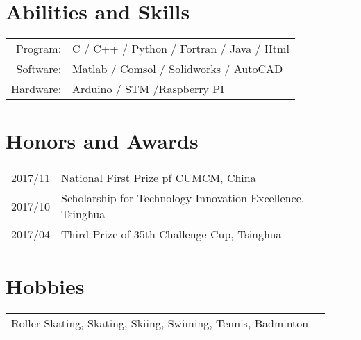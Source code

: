 \documentclass[a4paper,10pt]{article}
\begin{document}
\section{Abilities and Skills}
\begin{tabular}{rl}
Program:  & C / C++ / Python / Fortran / Java / Html \\
Software: & Matlab / Comsol / Solidworks / AutoCAD   \\
Hardware: & Arduino / STM /Raspberry PI              \\
\end{tabular}

\section{Honors and Awards}
\begin{tabular}{rl}
\textsc{2017/11} & National First Prize pf CUMCM, China                       \\
\textsc{2017/10} & Scholarship for Technology Innovation Excellence, Tsinghua \\
\textsc{2017/04} & Third Prize of 35th Challenge Cup, Tsinghua                \\
\end{tabular}

\section{Hobbies}
\begin{tabular}{rl}
Roller Skating, Skating, Skiing, Swiming, Tennis, Badminton
\end{tabular}
\end{document}
